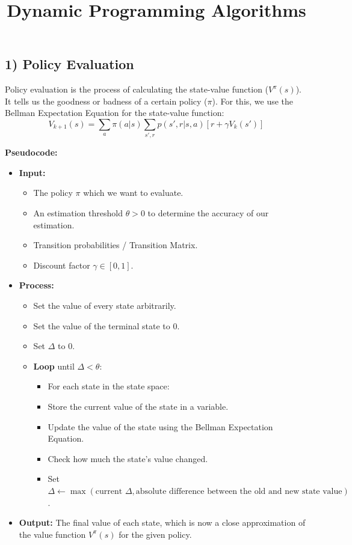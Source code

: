 \documentclass[12pt]{article}
\title{\textbf{Dynamic Programming Algorithms}}
\author{}
\date{}
\begin{document}
\maketitle


\subsection*{1) Policy Evaluation}
Policy evaluation is the process of calculating the state-value function ($V^\pi(s)$). It tells us the goodness or badness of a certain policy ($\pi$). For this, we use the Bellman Expectation Equation for the state-value function:
$$V_{k+1}(s) = \sum_a \pi(a|s) \sum_{s', r} p(s', r | s, a) \left[ r + \gamma V_k(s') \right]$$

\noindent\textbf{Pseudocode:}
\begin{itemize}[label=$\bullet$]
    \item \textbf{Input:}
    \begin{itemize}[label=$\circ$]
        \item The policy $\pi$ which we want to evaluate.
        \item An estimation threshold $\theta > 0$ to determine the accuracy of our estimation.
        \item Transition probabilities / Transition Matrix.
        \item Discount factor $\gamma \in [0,1]$.
    \end{itemize}
    \item \textbf{Process:}
    \begin{itemize}[label=$\circ$]
        \item Set the value of every state arbitrarily.
        \item Set the value of the terminal state to 0.
        \item Set $\Delta$ to 0.
        \item \textbf{Loop} until $\Delta < \theta$:
        \begin{itemize}[label=--]
            \item For each state in the state space:
            \item Store the current value of the state in a variable.
            \item Update the value of the state using the Bellman Expectation Equation.
            \item Check how much the state's value changed.
            \item Set $\Delta \leftarrow \max(\text{current } \Delta, \text{absolute difference between the old and new state value})$.
        \end{itemize}
    \end{itemize}
    \item \textbf{Output:} The final value of each state, which is now a close approximation of the value function $V^\pi(s)$ for the given policy.
\end{itemize}
\end{document}
